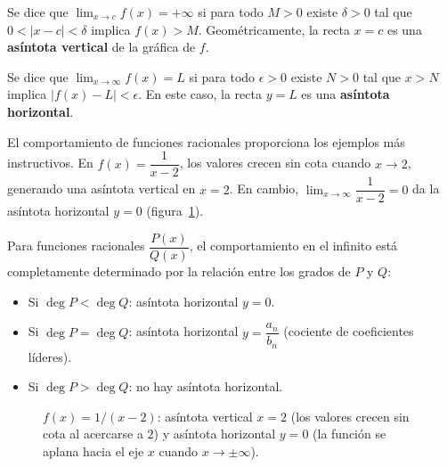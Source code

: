 \begin{definition}
Se dice que $\lim_{x\to c}f(x) = +\infty$ si para todo $M>0$ existe
$\delta>0$ tal que $0<|x-c|<\delta$ implica $f(x)>M$. Geométricamente,
la recta $x=c$ es una \textbf{asíntota vertical} de la gráfica de $f$.

Se dice que $\lim_{x\to\infty}f(x) = L$ si para todo $\epsilon>0$ existe
$N>0$ tal que $x>N$ implica $|f(x)-L|<\epsilon$. En este caso, la recta
$y=L$ es una \textbf{asíntota horizontal}.
\end{definition}

\begin{rem}
El comportamiento de funciones racionales proporciona los ejemplos más
instructivos. En $f(x)=\dfrac{1}{x-2}$, los valores crecen sin cota cuando
$x\to 2$, generando una asíntota vertical en $x=2$. En cambio,
$\lim_{x\to\infty}\dfrac{1}{x-2}=0$ da la asíntota horizontal $y=0$
(figura~\ref{fig:asintotas}).

Para funciones racionales $\dfrac{P(x)}{Q(x)}$, el comportamiento en el
infinito está completamente determinado por la relación entre los grados de
$P$ y $Q$:
\begin{itemize}
  \item Si $\deg P < \deg Q$: asíntota horizontal $y=0$.
  \item Si $\deg P = \deg Q$: asíntota horizontal $y=\dfrac{a_n}{b_n}$
        (cociente de coeficientes líderes).
  \item Si $\deg P > \deg Q$: no hay asíntota horizontal.
\end{itemize}
\end{rem}

\begin{figure}[!htbp]
\centering
{}
\caption{$f(x)=1/(x-2)$: asíntota vertical $x=2$ (los valores crecen sin
cota al acercarse a $2$) y asíntota horizontal $y=0$ (la función se aplana
hacia el eje $x$ cuando $x\to\pm\infty$).}
\label{fig:asintotas}
\end{figure}

